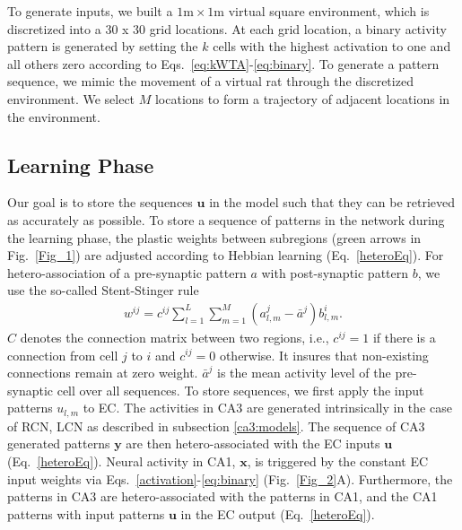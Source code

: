\documentclass[utf8]{frontiersSCNS} %
\begin{document}
To generate inputs, we built a $1\textrm{m} \times 1\textrm{m}$ virtual square environment, which is discretized into a 30 x 30 grid locations. At each grid location, a binary activity pattern is generated by setting the $k$ cells with the highest activation to one and all others zero according to Eqs.~\ref{eq:kWTA}-\ref{eq:binary}. To generate a pattern sequence, we mimic the movement of a virtual rat through the discretized environment. We select $M$ locations to form a trajectory of adjacent locations in the environment. %


\subsection{Learning Phase}
\label{learning}
Our goal is to store the sequences $\mathbf u$ in the model such that they can be retrieved as accurately as possible. To store a sequence of patterns in the network during the learning phase, the plastic weights between subregions (green arrows in Fig.~\ref{Fig_1}) are adjusted according to Hebbian learning (Eq.~\ref{heteroEq}). 
For hetero-association of a pre-synaptic pattern $a$ with post-synaptic pattern $b$, we use the so-called Stent-Stinger rule \citep{stent1973physiological}
%
\begin{align}
	\label{heteroEq}
	w^{ij} = c^{ij}\sum_{l=1}^L{\sum_{m=1}^M(a^j_{l, m}  - \bar {a}^j)b_{l, m}^i}.
\end{align}
$C$ denotes the connection matrix between two regions, i.e., $c^{ij} = 1$ if there is a connection from cell $j$ to $i$ and $c^{ij} = 0$ otherwise. It insures that non-existing connections remain at zero weight. $\bar{a}^j$ is the mean activity level of the pre-synaptic cell over all sequences. 
%
To store sequences, we first apply the input patterns $u_{l,m}$ to EC. The activities in CA3 are generated intrinsically in the case of RCN, LCN as described in subsection \ref{ca3:models}. The sequence of CA3 generated patterns $\mathbf y$ are then hetero-associated with the EC inputs $\mathbf u$ (Eq.~\ref{heteroEq}). %
Neural activity in CA1, $\mathbf x$, is triggered by the constant EC input weights via Eqs.~\ref{activation}-\ref{eq:binary} (Fig.~\ref{Fig_2}A). Furthermore, the patterns in CA3 are hetero-associated with the patterns in CA1, and the CA1 patterns with input patterns $\mathbf u$ in the EC output (Eq.~\ref{heteroEq}). 
\end{document}
